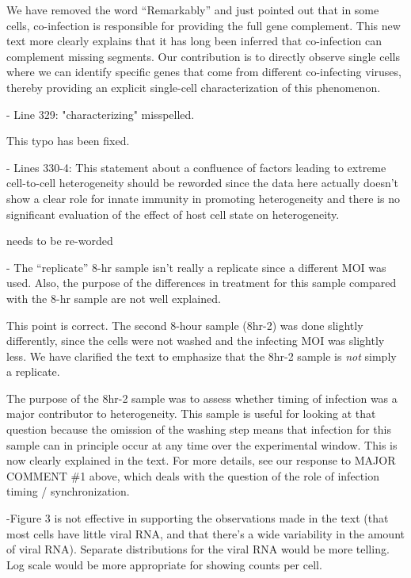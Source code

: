\documentclass[11pt, oneside]{article}   	%
\begin{document}
{\color{black} 
We have removed the word ``Remarkably'' and just pointed out that in some cells, co-infection is responsible for providing the full gene complement.
This new text more clearly explains that it has long been inferred that co-infection can complement missing segments.
Our contribution is to directly observe single cells where we can identify specific genes that come from different co-infecting viruses, thereby providing an explicit single-cell characterization of this phenomenon. 
}

- Line 329: "characterizing" misspelled. 

{\color{black}
This typo has been fixed.
}

- Lines 330-4: This statement about a confluence of factors leading to extreme cell-to-cell heterogeneity should be reworded since the data here actually doesn't show a clear role for innate immunity in promoting heterogeneity and there is no significant evaluation of the effect of host cell state on heterogeneity. 

{\color{red} needs to be re-worded}

- The ``replicate'' 8-hr sample isn't really a replicate since a different MOI was used. Also, the purpose of the differences in treatment for this sample compared with the 8-hr sample are not well explained. 

{\color{black}
This point is correct.
The second 8-hour sample (8hr-2) was done slightly differently, since the cells were not washed and the infecting MOI was slightly less.
We have clarified the text to emphasize that the 8hr-2 sample is \emph{not} simply a replicate.

The purpose of the 8hr-2 sample was to assess whether timing of infection was a major contributor to heterogeneity.
This sample is useful for looking at that question because the omission of the washing step means that infection for this sample can in principle occur at any time over the experimental window.
This is now clearly explained in the text.
For more details, see our response to MAJOR COMMENT \#1 above, which deals with the question of the role of infection timing / synchronization.
}

-Figure 3 is not effective in supporting the observations made in the text (that most cells have little viral RNA, and that there's a wide variability in the amount of viral RNA). Separate distributions for the viral RNA would be more telling. Log scale would be more appropriate for showing counts per cell. 
\end{document}
